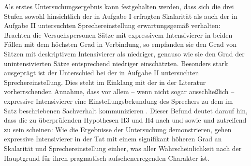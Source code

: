 Als erstes Untersuchungsergebnis kann festgehalten werden, dass sich die drei Stufen sowohl hinsichtlich der in Aufgabe I erfragten Skalarität als auch der in Aufgabe II untersuchten Sprechereinstellung erwartungsgemäß {verhalten}: Brachten die Versuchspersonen Sätze mit expressivem Intensivierer in beiden Fällen mit dem höchsten Grad in Verbindung, so empfanden sie den Grad von Sätzen mit deskriptivem Intensivierer als niedriger, genauso wie sie den Grad der unintensivierten Sätze entsprechend niedriger einschätzten. Besonders stark ausgeprägt ist der Unterschied bei der in {Aufgabe II} untersuchten Sprechereinstellung. Dies steht im Einklang mit der in der Literatur vorherrschenden Annahme, dass vor allem -- wenn nicht sogar ausschließlich -- expressive Intensivierer eine Einstellungsbekundung des Sprechers zu dem im Satz beschriebenen Sachverhalt kommunizieren \citep[vgl.][133]{Gutzmann.2019a}. Dieser Befund deutet darauf hin, dass die zu überprüfenden Hypothesen H3 und H4 nach \citet[22]{Paradis.1997} und \citet[133]{Gutzmann.2019a} sowie \citet[315]{Lang.1983} und {\citet[57]{Ortner.2014}} zutreffend zu sein scheinen: Wie die Ergebnisse der Untersuchung demonstrieren, gehen expressive Intensivierer in der Tat mit einem signifikant höheren Grad an Skalarität und Sprechereinstellung einher, was aller Wahrscheinlichkeit nach der Hauptgrund für ihren pragmatisch aufsehenerregenden Charakter ist.




